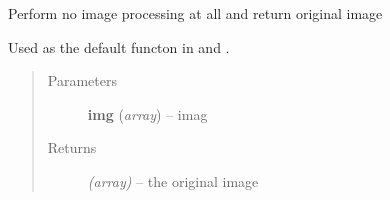 \documentclass[letterpaper,10pt,english]{sphinxmanual}
\begin{document}

\begin{fulllineitems}
\label{api/ClearMap.ImageProcessing:ClearMap.ImageProcessing.StackProcessing.noProcessing}
Perform no image processing at all and return original image

Used as the default functon in {\hyperref[api/ClearMap.ImageProcessing:ClearMap.ImageProcessing.StackProcessing.parallelProcessStack]{\emph{}}} and
{\hyperref[api/ClearMap.ImageProcessing:ClearMap.ImageProcessing.StackProcessing.sequentiallyProcessStack]{\emph{}}}.
\begin{quote}\begin{description}
\item[{Parameters}] \leavevmode
\textbf{img} (\emph{array}) --
imag

\item[{Returns}] \leavevmode
\emph{(array)} --
the original image

\end{description}\end{quote}

\end{fulllineitems}

\end{document}
